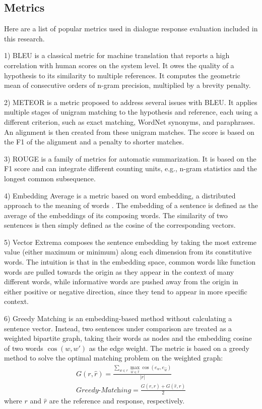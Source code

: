 \documentclass[runningheads]{llncs}
\begin{document}
\subsection{Metrics}
Here are a list of popular metrics used in dialogue response evaluation included in this research.

1) BLEU \cite{BLEU} is a classical metric for machine translation that reports a high correlation with human scores on the system level. It owes the quality of a hypothesis to its similarity to multiple references. It computes the geometric mean of consecutive orders of n-gram precision, multiplied by a brevity penalty.

2) METEOR \cite{METEOR} is a metric proposed to address several issues with BLEU. It applies multiple stages of unigram matching to the hypothesis and reference, each using a different criterion, such as exact matching, WordNet synonyms, and paraphrases. An alignment is then created from these unigram matches. The score is based on the F1 of the alignment and a penalty to shorter matches.

3) ROUGE \cite{ROUGE} is a family of metrics for automatic summarization. It is based on the F1 score and can integrate different counting units, e.g., n-gram statistics and the longest common subsequence.

4) Embedding Average is a metric based on word embedding, a distributed approach to the meaning of words \cite{word2vec}. The embedding of a sentence is defined as the average of the embeddings of its composing words. The similarity of two sentences is then simply defined as the cosine of the corresponding vectors.

5) Vector Extrema \cite{Vector_Extrema} composes the sentence embedding by taking the most extreme value (either maximum or minimum) along each dimension from its constitutive words. The intuition is that in the embedding space, common words like function words are pulled towards the origin as they appear in the context of many different words, while informative words are pushed away from the origin in either positive or negative direction, since they tend to appear in more specific context.

6) Greedy Matching \cite{GreedyAndOptimal} is an embedding-based method without calculating a sentence vector. Instead, two sentences under comparison are treated as a weighted bipartite graph, taking their words as nodes and the embedding cosine of two words $\cos(w, w')$ as the edge weight. The metric is based on a greedy method to solve the optimal matching problem on the weighted graph:
    \begin{align}
        G(r, \hat{r}) = \frac{
        \sum_{w \in r} \max_{\hat{w} \in \hat{r}} \cos(e_w, e_{\hat{w}})
        }{ |r| } \\
        \textit{Greedy-Matching} = \frac{
        G(r, \hat{r}) + G(\hat{r}, r)
        }{2}
    \end{align}
    where $r$ and $\hat{r}$ are the reference and response, respectively.
\end{document}
